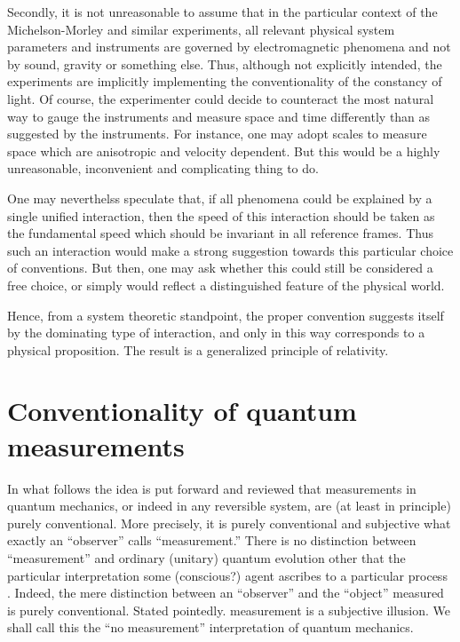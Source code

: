 Secondly, it is not unreasonable to assume that in the particular
context of the Michelson-Morley and similar experiments,
all relevant physical system
parameters and instruments are governed by electromagnetic phenomena
and not by sound, gravity or something else.
Thus, although not explicitly intended,
the experiments are implicitly implementing the conventionality
of the constancy of light.
Of course, the experimenter could decide to
counteract the most natural way to gauge the instruments and measure
space and time differently than as suggested by the instruments.
For instance, one may adopt scales to measure space which are
anisotropic and velocity dependent.
But this would be a highly unreasonable, inconvenient and complicating
thing to do.

One may neverthelss speculate that, if all phenomena could be explained by
a single unified interaction, then the speed of this interaction should be taken
as the fundamental speed which should be invariant in all reference frames.
Thus such an interaction would make
a strong suggestion towards this particular choice of conventions.
But then, one may ask whether this
could still be considered a free choice,
or simply would reflect a distinguished feature
of the physical world.

Hence, from a system theoretic standpoint,
the proper convention suggests itself
by the dominating type of interaction,
and only in this way corresponds
to a physical proposition.
The result is a generalized principle of relativity.


\section{Conventionality of quantum measurements}


In what follows the idea is put forward and reviewed that measurements
in  quantum mechanics, or indeed in any reversible system,
are (at least in principle) purely conventional.
More precisely, it is purely conventional and subjective what exactly an
``observer'' calls ``measurement.''
There is no distinction between ``measurement'' and ordinary
(unitary) quantum evolution other that the particular interpretation
some (conscious?) agent ascribes to a particular process
\cite{svozil-2000interface}.
Indeed, the mere distinction between an ``observer'' and the ``object''
measured is purely conventional.
Stated pointedly. measurement is a subjective illusion.
We shall call this the ``no measurement'' interpretation of quantum
mechanics.

